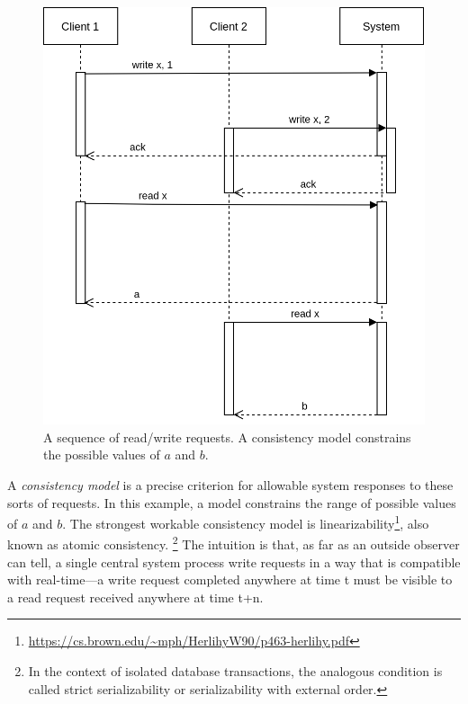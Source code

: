 \begin{figure}
  \includegraphics[scale=0.6]{Sequence Diagram.png}
  \caption{A sequence of read/write requests. A consistency model constrains the possible values of $a$ and $b$.}
\end{figure}

A \emph{consistency model} is a precise criterion for allowable system
responses to these sorts of requests. In this example, a model
constrains the range of possible values of $a$ and $b$. The strongest
workable consistency model is
linearizability\footnote{\url{https://cs.brown.edu/~mph/HerlihyW90/p463-herlihy.pdf}},
also known as atomic consistency. \footnote{In the context of isolated
database transactions, the analogous condition is called strict
serializability or serializability with external order.} The intuition
is that, as far as an outside observer can tell, a single central
system process write requests in a way that is compatible with
real-time---a write request completed anywhere at time t must be
visible to a read request received anywhere at time t+n.

